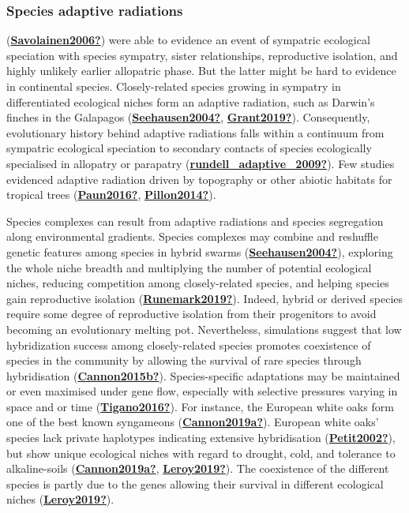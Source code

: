 \documentclass[12pt,twoside,a4paper, a]{article}
\begin{document}
\hypertarget{species-adaptive-radiations}{%
\subsubsection{Species adaptive radiations}\label{species-adaptive-radiations}}

(\protect\hyperlink{ref-Savolainen2006}{\textbf{Savolainen2006?}}) were able to evidence an event of sympatric ecological speciation with species sympatry, sister relationships, reproductive isolation, and highly unlikely earlier allopatric phase.
But the latter might be hard to evidence in continental species.
Closely-related species growing in sympatry in differentiated ecological niches form an adaptive radiation, such as Darwin's finches in the Galapagos (\protect\hyperlink{ref-Seehausen2004}{\textbf{Seehausen2004?}}, \protect\hyperlink{ref-Grant2019}{\textbf{Grant2019?}}).
Consequently, evolutionary history behind adaptive radiations falls within a continuum from sympatric ecological speciation to secondary contacts of species ecologically specialised in allopatry or parapatry (\protect\hyperlink{ref-rundell_adaptive_2009}{\textbf{rundell\_adaptive\_2009?}}).
Few studies evidenced adaptive radiation driven by topography or other abiotic habitats for tropical trees (\protect\hyperlink{ref-Paun2016}{\textbf{Paun2016?}}, \protect\hyperlink{ref-Pillon2014}{\textbf{Pillon2014?}}).

Species complexes can result from adaptive radiations and species segregation along environmental gradients.
Species complexes may combine and reshuffle genetic features among species in hybrid swarms (\protect\hyperlink{ref-Seehausen2004}{\textbf{Seehausen2004?}}),
exploring the whole niche breadth and multiplying the number of potential ecological niches,
reducing competition among closely-related species, and helping species gain reproductive isolation (\protect\hyperlink{ref-Runemark2019}{\textbf{Runemark2019?}}).
Indeed, hybrid or derived species require some degree of reproductive isolation from their progenitors to avoid becoming an evolutionary melting pot.
Nevertheless, simulations suggest that low hybridization success among closely-related species promotes coexistence of species in the community by allowing the survival of rare species through hybridisation (\protect\hyperlink{ref-Cannon2015b}{\textbf{Cannon2015b?}}).
Species-specific adaptations may be maintained or even maximised under gene flow, especially with selective pressures varying in space and or time (\protect\hyperlink{ref-Tigano2016}{\textbf{Tigano2016?}}).
For instance, the European white oaks form one of the best known syngameons (\protect\hyperlink{ref-Cannon2019a}{\textbf{Cannon2019a?}}).
European white oaks' species lack private haplotypes indicating extensive hybridisation (\protect\hyperlink{ref-Petit2002}{\textbf{Petit2002?}}), but show unique ecological niches with regard to drought, cold, and tolerance to alkaline-soils (\protect\hyperlink{ref-Cannon2019a}{\textbf{Cannon2019a?}}, \protect\hyperlink{ref-Leroy2019}{\textbf{Leroy2019?}}).
The coexistence of the different species is partly due to the genes allowing their survival in different ecological niches (\protect\hyperlink{ref-Leroy2019}{\textbf{Leroy2019?}}).
\end{document}
